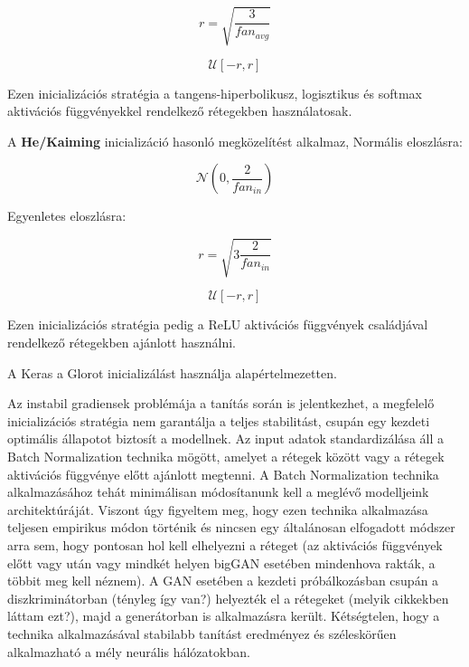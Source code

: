 $$r = \sqrt{\frac{3}{fan_{avg}}}$$

$$ \mathcal{U}\left[-r, r\right] $$

Ezen inicializációs stratégia a tangens-hiperbolikusz, logisztikus és softmax aktivációs függvényekkel rendelkező rétegekben használatosak. 

A \textbf{He/Kaiming} inicializáció hasonló megközelítést alkalmaz,
Normális eloszlásra:

$$ \mathcal{N}(0, \frac{2}{fan_{in}}) $$

Egyenletes eloszlásra:

$$r = \sqrt{3\frac{2}{fan_{in}}}$$

$$ \mathcal{U}\left[-r, r\right] $$

Ezen inicializációs stratégia pedig a ReLU aktivációs függvények családjával rendelkező rétegekben ajánlott használni.

A Keras a Glorot inicializálást használja alapértelmezetten.


Az instabil gradiensek problémája a tanítás során is jelentkezhet, a megfelelő inicializációs stratégia nem garantálja a teljes stabilitást, csupán egy kezdeti optimális állapotot biztosít a modellnek.
Az input adatok standardizálása áll a Batch Normalization technika mögött, amelyet a rétegek között vagy a rétegek aktivációs függvénye előtt ajánlott megtenni. A Batch Normalization technika alkalmazásához tehát minimálisan módosítanunk kell a meglévő modelljeink architektúráját. Viszont úgy figyeltem meg, hogy ezen technika alkalmazása teljesen empirikus módon történik és nincsen egy általánosan elfogadott módszer arra sem, hogy pontosan hol kell elhelyezni a réteget (az aktivációs függvények előtt vagy után vagy mindkét helyen bigGAN esetében mindenhova rakták, a többit meg kell néznem). A GAN esetében a kezdeti próbálkozásban csupán a diszkriminátorban (tényleg így van?) helyezték el a rétegeket (melyik cikkekben láttam ezt?), majd a generátorban is alkalmazásra került. Kétségtelen, hogy a technika alkalmazásával stabilabb tanítást eredményez és széleskörűen alkalmazható a mély neurális hálózatokban.

